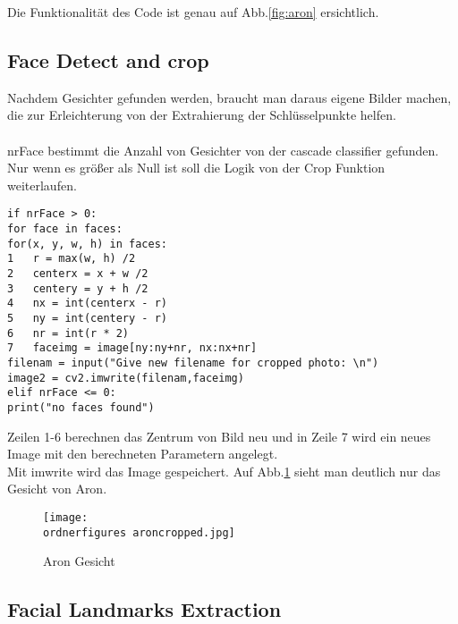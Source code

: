 Die Funktionalität des Code ist genau auf Abb.\ref{fig:aron} ersichtlich. \\

\subsection{Face Detect and crop}
Nachdem Gesichter gefunden werden, braucht man daraus eigene Bilder machen, die zur Erleichterung von der Extrahierung der Schlüsselpunkte helfen.\\\\  
nrFace bestimmt die Anzahl von Gesichter von der cascade classifier gefunden. 
Nur wenn es größer als Null ist soll die Logik von der Crop Funktion weiterlaufen. \\

\begin{lstlisting}
if nrFace > 0:
for face in faces:
for(x, y, w, h) in faces:
1	r = max(w, h) /2 
2	centerx = x + w /2 
3	centery = y + h /2
4	nx = int(centerx - r) 
5	ny = int(centery - r) 
6	nr = int(r * 2) 
7	faceimg = image[ny:ny+nr, nx:nx+nr] 
filenam = input("Give new filename for cropped photo: \n")
image2 = cv2.imwrite(filenam,faceimg)
elif nrFace <= 0:
print("no faces found")

\end{lstlisting}

Zeilen 1-6 berechnen das Zentrum von Bild neu und in Zeile 7 wird ein neues Image mit den berechneten Parametern angelegt.\\
Mit imwrite wird das Image gespeichert. Auf Abb.\ref{fig:aroncropped} sieht man deutlich nur das Gesicht von Aron. \\

\begin{figure}[H]
\texttt{[image: \\ordnerfigures aroncropped.jpg]}
\caption{Aron Gesicht}
\label{fig:aroncropped}
\end{figure}

\subsection{Facial Landmarks Extraction}


